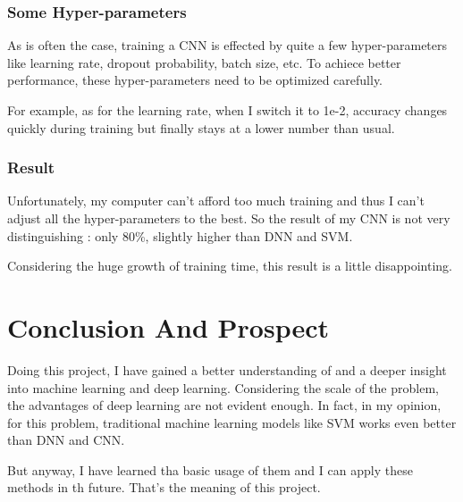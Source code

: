\documentclass[a4paper]{article}
\begin{document}
            \subsubsection{Some Hyper-parameters}
As is often the case, training a CNN is effected by quite a few hyper-parameters like learning rate, dropout probability, batch size, etc. To achiece better performance, these hyper-parameters need to be optimized carefully.

For example, as for the learning rate, when I switch it to 1e-2, accuracy changes quickly during training but finally stays at a lower number than usual.

            \subsubsection{Result}
Unfortunately, my computer can't afford too much training and thus I can't adjust all the hyper-parameters to the best. So the result of my CNN is not very distinguishing : only 80\%, slightly higher than DNN and SVM.

Considering the huge growth of training time, this result is a little disappointing.
    \newpage
    \section{Conclusion And Prospect}
Doing this project, I have gained a better understanding of and a deeper insight into machine learning and deep learning. Considering the scale of the problem, the advantages of deep learning are not evident enough. In fact, in my opinion, for this problem, traditional machine learning models like SVM works even better than DNN and CNN.

But anyway, I have learned tha basic usage of them and I can apply these methods in th future. That's the meaning of this project.
\end{document}
